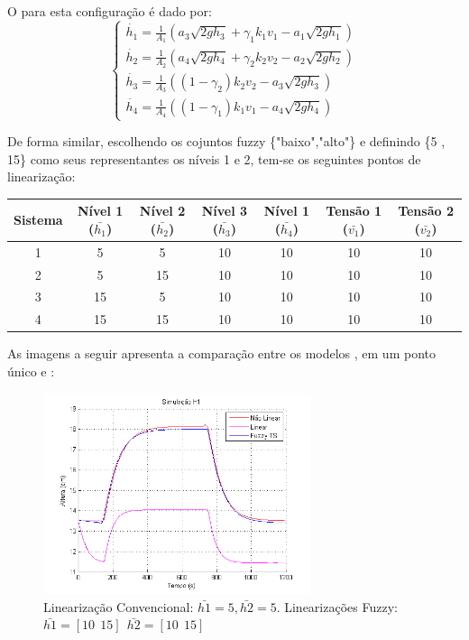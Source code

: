 O  para esta configuração é dado por:
\begin{equation}
\begin{cases}
\dot{h_{1}} = \frac{1}{A_{1}}(a_{3}\sqrt{2gh_{3}} + \gamma_{1}k_{1}v_{1} - a_{1}\sqrt{2gh_{1}})\\

\dot{h_{2}} = \frac{1}{A_{2}}(a_{4}\sqrt{2gh_{4}} + \gamma_{2}k_{2}v_{2} - a_{2}\sqrt{2gh_{2}})\\

\dot{h_{3}} = \frac{1}{A_{3}}((1 - \gamma_{2})k_{2}v_{2} - a_{3}\sqrt{2gh_{3}})\\

\dot{h_{4}} = \frac{1}{A_{4}}((1 - \gamma_{1})k_{1}v_{1} - a_{4}\sqrt{2gh_{4}})
\end{cases}
\label{eqFNMNL}
\end{equation}

De forma similar, escolhendo os cojuntos fuzzy \{"baixo","alto"\} e definindo \{5 , 15\} como seus representantes os níveis 1 e 2, tem-se os seguintes pontos de linearização:
\begin{center}
	\begin{tabular}{|c|c|c|c|c|c|c|}
		\hline
		Sistema & Nível 1 ($\bar{h_1}$) & Nível 2 ($\bar{h_2}$) & Nível 3 ($\bar{h_3}$) & Nível 1 ($\bar{h_4}$) & Tensão 1 ($\bar{v_1}$) & Tensão 2 ($\bar{v_2}$) \\ \hline
		1 & 5 & 5 & 10 & 10 & 10 & 10 \\ \hline
		2 & 5 & 15 & 10 & 10 & 10 & 10 \\ \hline
		3 & 15 & 5 & 10 & 10 & 10 & 10 \\ \hline
		4 & 15 & 15 & 10 & 10 & 10 & 10 \\	\hline
	\end{tabular}
\end{center}

As imagens a seguir apresenta a comparação entre os modelos ,  em um ponto único e :

\begin{figure}[H]
	\centering
	\includegraphics[width=0.7\textwidth]{img/FM_h1_5_10_15.png}
	\caption{\small Linearização Convencional: $ \bar{h1}=5, \bar{h2}=5$. Linearizações Fuzzy: $\bar{h1}=[10 \ \ 15] \ \ \bar{h2}=[10 \ \ 15]$ }
	\label{figH1TS2}
\end{figure}

